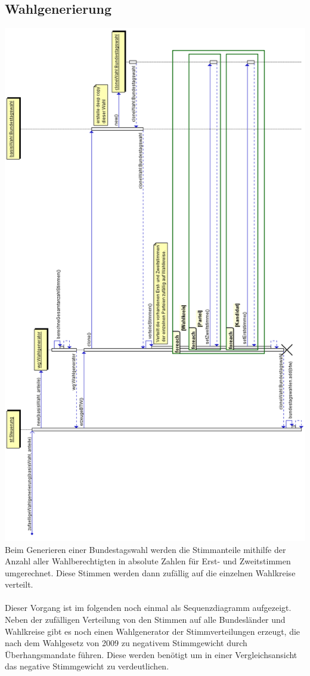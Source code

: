 \documentclass[12pt,a4paper,titlepage]{article}
\begin{document}
\subsection{Wahlgenerierung}
\includegraphics[scale=0.45]{Sequenzdiagramme/Wahlgenerierung.png}
Beim Generieren einer Bundestagswahl werden die Stimmanteile mithilfe der Anzahl aller Wahlberechtigten in absolute Zahlen für Erst- und Zweitstimmen umgerechnet. Diese Stimmen werden dann zufällig auf die einzelnen Wahlkreise verteilt.\\\\
Dieser Vorgang ist im folgenden noch einmal als Sequenzdiagramm aufgezeigt.
Neben der zufälligen Verteilung von den Stimmen auf alle Bundesländer und Wahlkreise gibt es noch einen Wahlgenerator der Stimmverteilungen erzeugt, die nach dem Wahlgesetz von 2009 zu negativem Stimmgewicht durch Überhangsmandate führen. Diese werden benötigt um in einer Vergleichsansicht das negative Stimmgewicht zu verdeutlichen.
\end{document}
